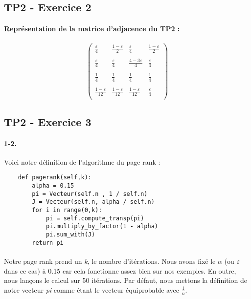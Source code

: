 \documentclass[10pt,a4paper]{article}
\begin{document}
\subsection{TP2 - Exercice 2}
\paragraph{Représentation de la matrice d'adjacence du TP2 : }
$$
\begin{pmatrix}
\frac{\varepsilon}{4} & \frac{1 - \varepsilon}{2} & \frac{\varepsilon}{4} & \frac{1 - \varepsilon}{2} \\
\\
\frac{\varepsilon}{4} & \frac{\varepsilon}{4} & \frac{4 - 3\varepsilon}{4} & \frac{\varepsilon}{4} \\
\\
\frac{1}{4} & \frac{1}{4} & \frac{1}{4} & \frac{1}{4} \\
\\
\frac{1 - \varepsilon}{12} & \frac{1 - \varepsilon}{12} & \frac{1 - \varepsilon}{12} & \frac{\varepsilon}{4} \\
\end{pmatrix}
$$

\subsection{TP2 - Exercice 3}
\paragraph{1-2.} Voici notre définition de l'algorithme du page rank : \\
\begin{verbatim}
    def pagerank(self,k):
        alpha = 0.15
        pi = Vecteur(self.n , 1 / self.n)
        J = Vecteur(self.n, alpha / self.n)
        for i in range(0,k):
            pi = self.compute_transp(pi)
            pi.multiply_by_factor(1 - alpha)
            pi.sum_with(J)
        return pi
\end{verbatim}
\paragraph{}Notre page rank prend un \textit{k}, le nombre d'itérations. Nous avons fixé le $\alpha$ (ou $\varepsilon$ dans ce cas) à 0.15 car cela fonctionne assez bien sur nos exemples. En outre, nous lançons le calcul sur 50 itérations. Par défaut, nous mettons la définition de notre vecteur \textit{pi} comme étant le vecteur équiprobable avec $\frac{1}{n}$.
\end{document}
